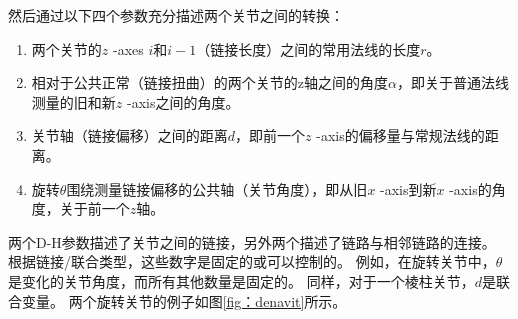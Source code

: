 
然后通过以下四个参数充分描述两个关节之间的转换：


\begin{enumerate}
\item 两个关节的$ z $ -axes $ i $和$ i-1 $（链接长度）之间的常用法线的长度$ r $。
\item 相对于公共正常（链接扭曲）的两个关节的z轴之间的角度$ \alpha $，即关于普通法线测量的旧和新$ z $ -axis之间的角度。
\item 关节轴（链接偏移）之间的距离$ d $，即前一个$ z $ -axis的偏移量与常规法线的距离。
\item 旋转$ \theta $围绕测量链接偏移的公共轴（关节角度），即从旧$ x $ -axis到新$ x $ -axis的角度，关于前一个$ z$轴。
\end{enumerate}


两个D-H参数描述了关节之间的链接，另外两个描述了链路与相邻链路的连接。 根据链接/联合类型，这些数字是固定的或可以控制的。 例如，在旋转关节中，$ \theta$是变化的关节角度，而所有其他数量是固定的。 同样，对于一个棱柱关节，$ d $是联合变量。 两个旋转关节的例子如图\ref {fig：denavit}所示。

